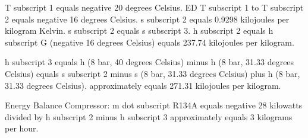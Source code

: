 T subscript 1 equals negative 20 degrees Celsius.  
ED T subscript 1 to T subscript 2 equals negative 16 degrees Celsius.  
s subscript 2 equals 0.9298 kilojoules per kilogram Kelvin.  
s subscript 2 equals s subscript 3.  
h subscript 2 equals h subscript G (negative 16 degrees Celsius) equals 237.74 kilojoules per kilogram.  

h subscript 3 equals h (8 bar, 40 degrees Celsius) minus h (8 bar, 31.33 degrees Celsius)  
equals s subscript 2 minus s (8 bar, 31.33 degrees Celsius) plus h (8 bar, 31.33 degrees Celsius).  
approximately equals 271.31 kilojoules per kilogram.  

Energy Balance Compressor:  
m dot subscript R134A equals negative 28 kilowatts divided by h subscript 2 minus h subscript 3 approximately equals 3 kilograms per hour.